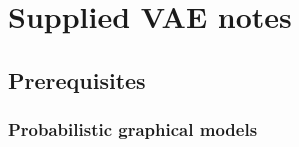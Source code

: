 \documentclass[11pt]{article}
\begin{document}
\clearpage

\appendix

\section{Supplied VAE notes}\label{sect:Supplied VAE notes}

\subsection{Prerequisites}

\subsubsection{Probabilistic graphical models}\label{sect:Probabilistic graphical models}

\begin{figure}[H]
    \centering
\end{figure}
\end{document}
